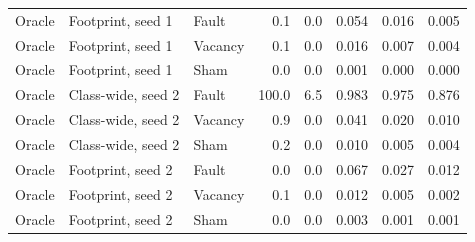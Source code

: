 \begin{tabular}{lllrrrrr}
Oracle & Footprint, seed 1 & Fault & 0.1 & 0.0 & 0.054 & 0.016 & 0.005 \\
Oracle & Footprint, seed 1 & Vacancy & 0.1 & 0.0 & 0.016 & 0.007 & 0.004 \\
Oracle & Footprint, seed 1 & Sham & 0.0 & 0.0 & 0.001 & 0.000 & 0.000 \\
Oracle & Class-wide, seed 2 & Fault & 100.0 & 6.5 & 0.983 & 0.975 & 0.876 \\
Oracle & Class-wide, seed 2 & Vacancy & 0.9 & 0.0 & 0.041 & 0.020 & 0.010 \\
Oracle & Class-wide, seed 2 & Sham & 0.2 & 0.0 & 0.010 & 0.005 & 0.004 \\
Oracle & Footprint, seed 2 & Fault & 0.0 & 0.0 & 0.067 & 0.027 & 0.012 \\
Oracle & Footprint, seed 2 & Vacancy & 0.1 & 0.0 & 0.012 & 0.005 & 0.002 \\
Oracle & Footprint, seed 2 & Sham & 0.0 & 0.0 & 0.003 & 0.001 & 0.001 \\
\bottomrule
\end{tabular}
